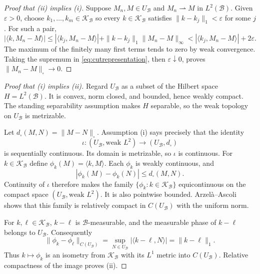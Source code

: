 \documentclass[11pt]{article}
\newcommand{\cB}{\mathcal B}
\newcommand{\cK}{\mathcal K}
\begin{document}
\begin{proof}[Proof that \textup{(ii)} implies \textup{(i)}]
Suppose $M_n,M\in U_{\cB}$ and $M_n\rightharpoonup M$ in $L^2(\cB)$.  Given
$\varepsilon>0$, choose $k_1,\dots,k_m\in\cK_{\cB}$ so every
$k\in\cK_{\cB}$ satisfies $\|k-k_j\|_1<\varepsilon$ for some $j$.
For such a pair,
\[
 |\langle k,M_n-M\rangle|
 \leq |\langle k_j,M_n-M\rangle|
      +\|k-k_j\|_1\|M_n-M\|_\infty
 < |\langle k_j,M_n-M\rangle|+2\varepsilon.
\]
The maximum of the finitely many first terms tends to zero by weak
convergence.  Taking the supremum in \eqref{eq:cutrepresentation}, then
$\varepsilon\downarrow0$, proves $\|M_n-M\|_\square\to0$.
\end{proof}

\begin{proof}[Proof that \textup{(i)} implies \textup{(ii)}]
Regard $U_{\cB}$ as a subset of the Hilbert space $H=L^2(\cB)$.  It is
convex, norm closed, and bounded, hence weakly compact.  The standing
separability assumption makes $H$ separable, so the weak topology on
$U_{\cB}$ is metrizable.

Let $d_\square(M,N)=\|M-N\|_\square$.  Assumption (i) says precisely that
the identity
\[
 \iota:(U_{\cB},\text{weak }L^2)\longrightarrow(U_{\cB},d_\square)
\]
is sequentially continuous.  Its domain is metrizable, so $\iota$ is
continuous.  For $k\in\cK_{\cB}$ define
$\phi_k(M)=\langle k,M\rangle$.  Each $\phi_k$ is weakly continuous, and
\[
 |\phi_k(M)-\phi_k(N)|\leq d_\square(M,N).
\]
Continuity of $\iota$ therefore makes the family
$\{\phi_k:k\in\cK_{\cB}\}$ equicontinuous on the compact space
$(U_{\cB},\text{weak }L^2)$.  It is also pointwise bounded.  Arzel\`a--Ascoli
shows that this family is relatively compact in $C(U_{\cB})$ with the
uniform norm.

For $k,\ell\in\cK_{\cB}$, $k-\ell$ is $\cB$-measurable, and the measurable
phase of $k-\ell$ belongs to $U_{\cB}$.  Consequently
\begin{equation}\label{eq:isometry}
 \|\phi_k-\phi_\ell\|_{C(U_{\cB})}
 =\sup_{N\in U_{\cB}}|\langle k-\ell,N\rangle|
 =\|k-\ell\|_1.
\end{equation}
Thus $k\mapsto\phi_k$ is an isometry from $\cK_{\cB}$ with its $L^1$
metric into $C(U_{\cB})$.  Relative compactness of the image proves (ii).
\end{proof}
\end{document}
